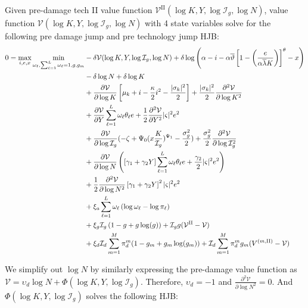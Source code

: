 \documentclass[11pt]{article}
\begin{document}
	Given pre-damage tech II value function $\mathcal{V}^{\text{II}}(\log K,Y, \log \mathcal{I}_g, \log N)$,  value function $\mathcal{V}(\log K,Y, \log \mathcal{I}_g, \log N)$ with 4 state variables solve for the following pre damage jump and pre technology jump HJB:
		\begin{align*} 
		0 = \max_{i,e,x} \min_{\omega_\ell, \sum_{\ell = 1}^L \omega_\ell = 1, g, g_m } &   - \delta \mathcal{V}(\log K,Y, \log \mathcal{I}_g, \log N) +  \delta \log \left( \alpha - i -  \alpha \overline{\vartheta} \left[ 1 - \left(\frac {e} { \alpha \overline\lambda K} \right) \right]^\theta  - x \right)\\
		& - \delta \log N + \delta\log K \cr 
		& + \frac {\partial \mathcal{V}}{\partial \log K} 
		\left[ \mu_k    + i   -
		{\frac { \kappa} 2} i^2  -  \frac  {|\sigma_k|^2}  2\right]  + \frac {|\sigma_k|^2} 2  \frac {\partial^2 \mathcal{V}}{\partial \log K^2} \cr
		& + \frac {\partial  \mathcal{V}}{\partial Y}  \sum_{\ell=1}^L \omega_\ell  \theta_\ell {e} + {\frac 1 2} \frac {\partial^2 \mathcal{V}}{\partial Y^2} |\varsigma|^2 e^2  \cr
		& + \frac{\partial \mathcal{V}}{\partial \log \mathcal{I}_g} (- \zeta + \Psi_0 (x\frac{K}{\mathcal{I}_g})^{\Psi_1} - \frac{\sigma_g^2}{2} ) + \frac{\sigma_g^2}{2}\frac{\partial^2 \mathcal{V}}{\partial \log \mathcal{I}_g^2} \\
		& + \frac{\partial \mathcal{V}}{\partial \log N} \left( \left[ \gamma_1 + \gamma_2 Y\right]   \sum_{\ell=1}^L \omega_\ell \theta_\ell {e} + \frac{\gamma_2}{2} |\varsigma|^2  e^2 \right) \cr
		& + \frac{1}{2}\frac{\partial^2 \mathcal{V}}{\partial \log N^2} \left[ \gamma_1 + \gamma_2 Y\right]^2 |\varsigma|^2 e^2 \cr
		& + \xi_a \sum_{\ell = 1}^L \omega_\ell \left( \log \omega_\ell - \log \pi_\ell \right) \\
		& + \xi_g \mathcal{I}_g \left(1 - g + g  \log(g) \right) + \mathcal{I}_g g (\mathcal{V}^{\text{II}} - \mathcal{V} )\\
		&  + \xi_d \mathcal{I}_d \sum_{m=1}^M \pi_d^m(1 - g_m + g_m \log(g_m))+ \mathcal{I}_d\sum_{m=1}^M \pi_d^m g_m (V^{(m, \text{II})} - \mathcal{V})
	\end{align*} 

	We simplify out $\log N$ by similarly expressing the pre-damage value function as  $\mathcal{V} = \upsilon_d \log N + \Phi(\log K, Y, \log \mathcal{I}_g)$. 
Therefore, $\upsilon_d=-1$ and $\frac{\partial^2 \mathcal{V}}{\partial \log N^2} = 0$. And $\Phi(\log K,Y, \log \mathcal{I}_g)$ solves the following HJB:
	
\end{document}
